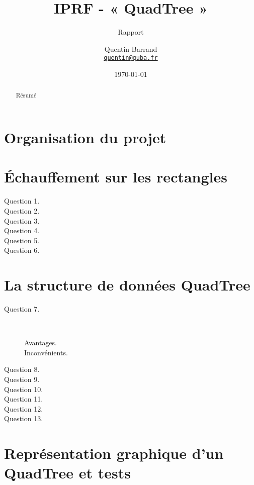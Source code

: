 \documentclass[11pt]{scrartcl}
\title{\textbf{IPRF - « QuadTree »}}
\subtitle{Rapport}
\author{Quentin Barrand\\
		\href{mailto:quentin@quba.fr}{\texttt{quentin@quba.fr}}}
\date{\today}
\begin{document}
\maketitle

\begin{abstract}
Résumé
\end{abstract}

\break

\section*{Organisation du projet}

\section{Échauffement sur les rectangles}

\begin{description}
\item[Question 1.]
\item[Question 2.]
\item[Question 3.]
\item[Question 4.]
\item[Question 5.]
\item[Question 6.]
\end{description}

\section{La structure de données QuadTree}

\begin{description}
\item[Question 7.] \hfill \\
	\begin{description}
	\item[Avantages.]
	\item[Inconvénients.]
	\end{description}
\item[Question 8.]
\item[Question 9.]
\item[Question 10.]
\item[Question 11.]
\item[Question 12.]
\item[Question 13.]
\end{description}

\section{Représentation graphique d'un QuadTree et tests}
\end{document}
